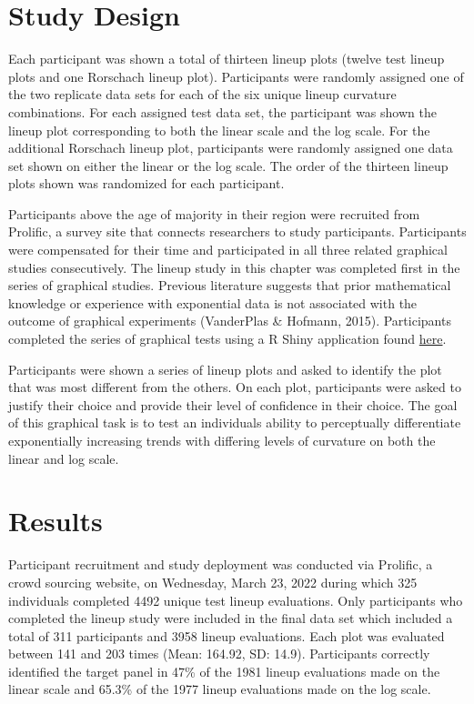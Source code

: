 \documentclass[print]{nuthesis}
\begin{document}
\hypertarget{study-design}{%
\section{Study Design}\label{study-design}}

Each participant was shown a total of thirteen lineup plots (twelve test lineup plots and one Rorschach lineup plot).
Participants were randomly assigned one of the two replicate data sets for each of the six unique lineup curvature combinations.
For each assigned test data set, the participant was shown the lineup plot corresponding to both the linear scale and the log scale.
For the additional Rorschach lineup plot, participants were randomly assigned one data set shown on either the linear or the log scale.
The order of the thirteen lineup plots shown was randomized for each participant.

Participants above the age of majority in their region were recruited from Prolific, a survey site that connects researchers to study participants.
Participants were compensated for their time and participated in all three related graphical studies consecutively.
The lineup study in this chapter was completed first in the series of graphical studies.
Previous literature suggests that prior mathematical knowledge or experience with exponential data is not associated with the outcome of graphical experiments (VanderPlas \& Hofmann, 2015).
Participants completed the series of graphical tests using a R Shiny application found \href{https://shiny.srvanderplas.com/perception-of-statistical-graphics/}{here}.

Participants were shown a series of lineup plots and asked to identify the plot that was most different from the others.
On each plot, participants were asked to justify their choice and provide their level of confidence in their choice.
The goal of this graphical task is to test an individuals ability to perceptually differentiate exponentially increasing trends with differing levels of curvature on both the linear and log scale.

\hypertarget{results}{%
\section{Results}\label{results}}

Participant recruitment and study deployment was conducted via Prolific, a crowd sourcing website, on Wednesday, March 23, 2022 during which 325 individuals completed 4492 unique test lineup evaluations.
Only participants who completed the lineup study were included in the final data set which included a total of 311 participants and 3958 lineup evaluations.
Each plot was evaluated between 141 and 203 times (Mean: 164.92, SD: 14.9).
Participants correctly identified the target panel in 47\% of the 1981 lineup evaluations made on the linear scale and 65.3\% of the 1977 lineup evaluations made on the log scale.
\end{document}
